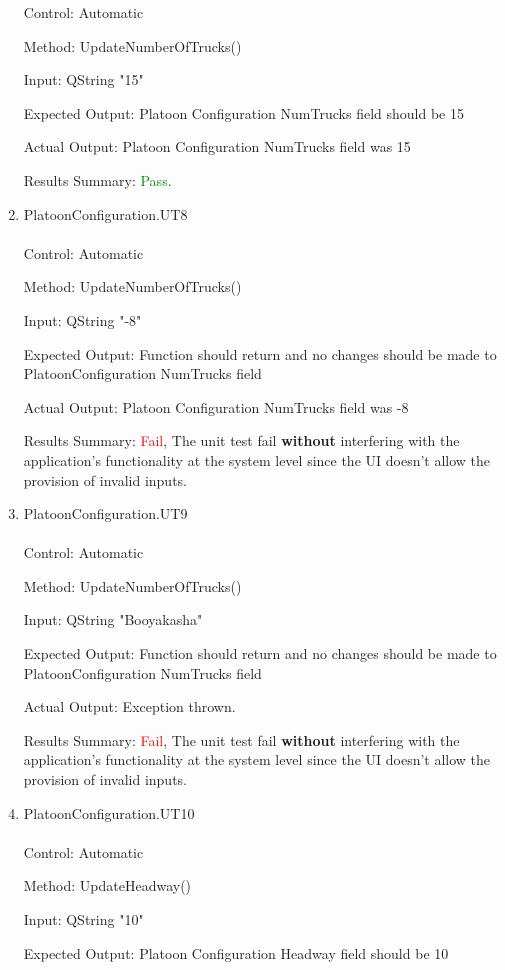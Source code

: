 \documentclass[12pt, titlepage]{article}
\begin{document}
\begin{enumerate}
  Control: Automatic

  Method: UpdateNumberOfTrucks()

  Input: QString "15"

  Expected Output: Platoon Configuration NumTrucks field should be 15

  Actual Output: Platoon Configuration NumTrucks field was 15

  Results Summary: \textcolor{green} {Pass}.
\item{PlatoonConfiguration.UT8}\\\\
  Control: Automatic

  Method: UpdateNumberOfTrucks()

  Input: QString "-8"

  Expected Output: Function should return and no changes should be made to PlatoonConfiguration NumTrucks field

  Actual Output: Platoon Configuration NumTrucks field was -8

  Results Summary: \textcolor{red} {Fail}, The unit test fail
\textbf{without} interfering with the application’s functionality at the system level
since the UI doesn’t allow the provision of invalid inputs.

  \item{PlatoonConfiguration.UT9}\\\\
  Control: Automatic

  Method: UpdateNumberOfTrucks()

  Input: QString "Booyakasha"

  Expected Output: Function should return and no changes should be made to PlatoonConfiguration NumTrucks field

  Actual Output: Exception thrown.

  Results Summary: \textcolor{red} {Fail}, The unit test fail
\textbf{without} interfering with the application’s functionality at the system level
since the UI doesn’t allow the provision of invalid inputs.

  \item{PlatoonConfiguration.UT10}\\\\
  Control: Automatic

  Method: UpdateHeadway()

  Input: QString "10"

  Expected Output: Platoon Configuration Headway field should be 10


\end{enumerate}
\end{document}
